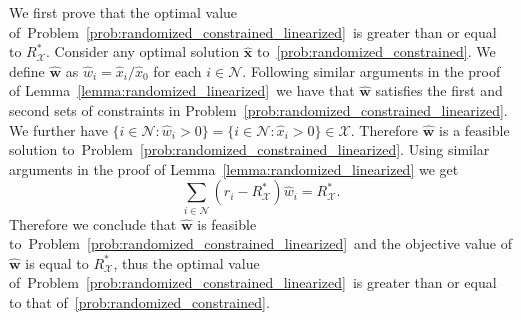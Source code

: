 \documentclass[mnsc,non-blindrev]{informs3}
\theoremstyle{definition}
\begin{document}
\begin{appendices}{\Large{}}
We first prove that the optimal value of~Problem~\eqref{prob:randomized_constrained_linearized}~is greater than or equal to $R_{\mathcal{X}}^*$. Consider any optimal solution $\hat{\bm{x}}$ to~\ref{prob:randomized_constrained}. We define $\hat{\bm{w}}$ as $\hat{w}_i=\hat{x}_i/\hat{x}_0$ for each $i\in\mathcal{N}$. Following similar arguments in the proof of Lemma~\ref{lemma:randomized_linearized}~we have that $\hat{\bm{w}}$ satisfies the first and second sets of constraints in Problem~\eqref{prob:randomized_constrained_linearized}. We further have $\{i\in\mathcal{N}:\hat{w}_i>0\}=\{i\in\mathcal{N}:\hat{x}_i>0\}\in\mathcal{X}$. Therefore $\hat{\bm{w}}$ is a feasible solution to~Problem~\eqref{prob:randomized_constrained_linearized}. Using similar arguments in the proof of Lemma~\ref{lemma:randomized_linearized} we get
\begin{equation*}
\sum_{i\in\mathcal{N}}(r_i-R_{\mathcal{X}}^*)\hat{w}_i=R_{\mathcal{X}}^*.
\end{equation*}
Therefore we conclude that $\hat{\bm{w}}$ is feasible to~Problem~\eqref{prob:randomized_constrained_linearized}~and the objective value of $\hat{\bm{w}}$ is equal to $R_{\mathcal{X}}^*$, thus the optimal value of~Problem~\eqref{prob:randomized_constrained_linearized}~is greater than or equal to that of~\ref{prob:randomized_constrained}.


\end{appendices}
\end{document}
